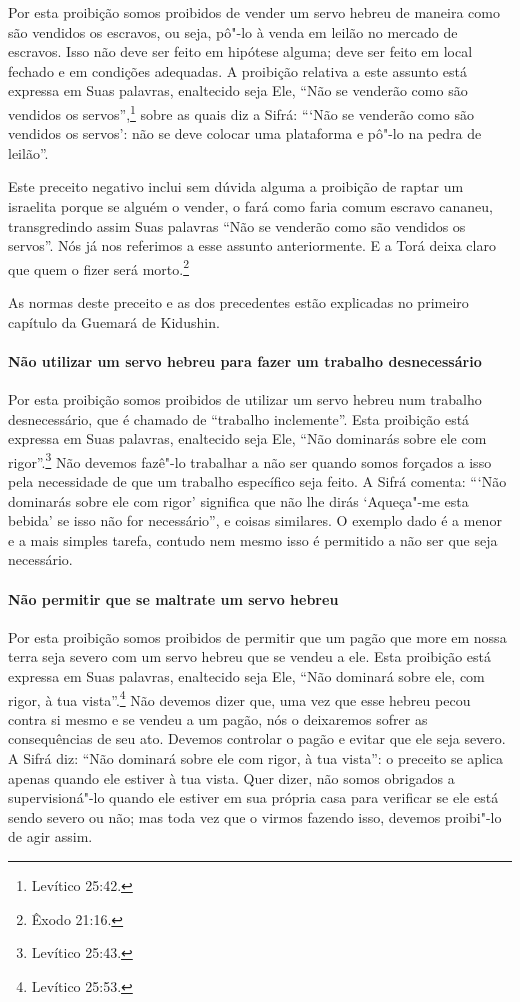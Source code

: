 \begin{multicols}{2}
Por esta proibição somos proibidos de vender um servo hebreu de maneira
como são vendidos os escravos, ou seja, pô"-lo à venda em leilão no
mercado de escravos. Isso não deve ser feito em hipótese alguma; deve
ser feito em local fechado e em condições adequadas. A proibição
relativa a este assunto está expressa em Suas palavras, enaltecido seja
Ele, ``Não se venderão como são vendidos os servos'',\footnote{Levítico 25:42.}
sobre as quais diz a Sifrá\starr: ```Não se venderão como são vendidos os
servos': não se deve colocar uma plataforma e pô"-lo na pedra de
leilão''.

Este preceito negativo inclui sem dúvida alguma a proibição de raptar
um israelita porque se alguém o vender, o fará como faria comum escravo
cananeu, transgredindo assim Suas palavras ``Não se venderão como são
vendidos os servos''. Nós já nos referimos a esse assunto
anteriormente. E a Torá\starr{} deixa claro que quem o fizer será
morto.\footnote{Êxodo 21:16.}

As normas deste preceito e as dos precedentes estão explicadas no
primeiro capítulo da Guemará\starr{} de Kidushin\starr.


\paragraph{Não utilizar um servo hebreu para fazer um trabalho desnecessário}

Por esta proibição somos proibidos de utilizar um servo hebreu num
trabalho desnecessário, que é chamado de ``trabalho inclemente''. Esta
proibição está expressa em Suas palavras, enaltecido seja Ele, ``Não
dominarás sobre ele com rigor''.\footnote{Levítico 25:43.} Não devemos fazê"-lo
trabalhar a não ser quando somos forçados a isso pela necessidade de
que um trabalho específico seja feito. A Sifrá\starr{} comenta: ```Não dominarás
sobre ele com rigor' significa que não lhe dirás `Aqueça"-me esta bebida'
se isso não for necessário'', e coisas similares. O exemplo dado é a
menor e a mais simples tarefa, contudo nem mesmo isso é permitido a não
ser que seja necessário.

\paragraph{Não permitir que se maltrate um servo hebreu}

Por esta proibição somos proibidos de permitir que um pagão que more em
nossa terra seja severo com um servo hebreu que se vendeu a ele. Esta
proibição está expressa em Suas palavras, enaltecido seja Ele, ``Não
dominará sobre ele, com rigor, à tua vista''.\footnote{Levítico 25:53.} Não
devemos dizer que, uma vez que esse hebreu pecou contra si mesmo e se
vendeu a um pagão, nós o deixaremos sofrer as consequências de seu ato.
Devemos controlar o pagão e evitar que ele seja severo. A Sifrá\starr{} diz:
``Não dominará sobre ele com rigor, à tua vista'': o preceito se aplica
apenas quando ele estiver à tua vista. Quer dizer, não somos
obrigados a supervisioná"-lo quando ele estiver em sua própria casa para
verificar se ele está sendo severo ou não; mas toda vez que o virmos
fazendo isso, devemos proibi"-lo de agir assim.


\end{multicols}
